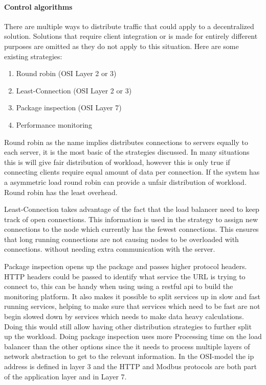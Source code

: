 \paragraph{Control algorithms} %
There are multiple ways to distribute traffic that could apply to a decentralized solution.
Solutions that require client integration or is made for entirely different purposes are omitted as they do not apply to this situation.
Here are some existing strategies:
\begin{enumerate}
	\item Round robin (OSI Layer 2 or 3) %
	\item Least-Connection (OSI Layer 2 or 3) %
	\item Package inspection (OSI Layer 7)
	\item Performance monitoring
\end{enumerate}

Round robin as the name implies distributes connections to servers equally to each server, it is the most basic of the strategies discussed. In many situations this is will give fair distribution of workload, however this is only true if connecting clients require equal amount of data per connection. If the system has a asymmetric load round robin can provide a unfair distribution of workload. 
Round robin has the least overhead.

Least-Connection takes advantage of the fact that the load balancer need to keep track of open connections. This information is used in the strategy to assign new connections to the node which currently has the fewest connections.
This ensures that long running connections are not causing nodes to be overloaded with connections.
without needing extra communication with the server.

Package inspection opens up the package and passes higher protocol headers. HTTP headers could be passed to identify what service the URL is trying to connect to, this can be handy when using using a restful api to build the monitoring platform.
It also makes it possible to split services up in slow and fast running services, helping to make sure that services which need to be fast are not begin slowed down by services which needs to make data heavy calculations.
Doing this would still allow having other distribution strategies to further split up the workload.
Doing package inspection uses more Processing time on the load balancer than the other options since the it needs to process multiple layers of network abstraction to get to the relevant information. In the OSI-model the ip address is defined in layer 3 and the HTTP and Modbus protocols are both part of the application layer and in Layer 7. 

